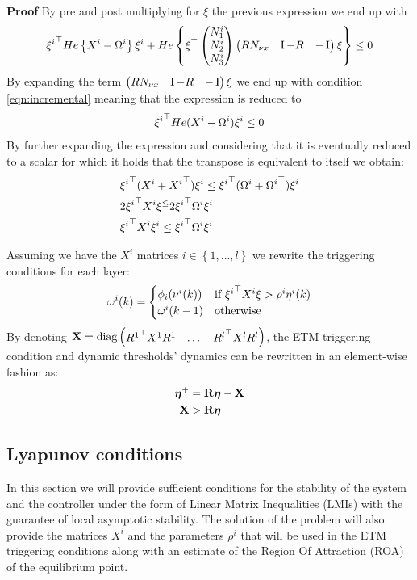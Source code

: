 \documentclass{article}
\begin{document}
\textbf{Proof} By pre and post multiplying for $\xi$ the previous expression we end up with
$$
    {\xi^i}^\top He\left\{X^i - \Omega^i\right\} \xi^i + He\left\{ \xi^\top \left(\begin{matrix}N^i_1\\ N^i_2\\ N^i_3\end{matrix}\right) \left(\begin{matrix}R N_{\nu x} & \operatorname{I} - R & -\operatorname{I}\end{matrix}\right) \xi \right\} \leq 0
$$
By expanding the term $\left(\begin{matrix}R N_{\nu x} & \operatorname{I} - R & -\operatorname{I}\end{matrix}\right) \xi$ we end up with condition \ref{eqn:incremental} meaning that the expression is reduced to
$$
    {\xi^i}^\top He(X^i - \Omega^i) \xi^i \leq 0
$$
By further expanding the expression and considering that it is eventually reduced to a scalar for which it holds that the transpose is equivalent to itself we obtain:  
\begin{equation*}
\begin{aligned}
    &{\xi^i}^\top (X^i + {X^i}^\top) \xi^i \leq {\xi^i}^\top (\Omega^i + {\Omega^i}^\top) \xi^i\\
    &2 {\xi^i}^\top X^i\xi^ \leq 2 {\xi^i}^\top \Omega^i \xi^i\\
    & {\xi^i}^\top X^i \xi^i \leq {\xi^i}^\top \Omega^i \xi^i
\end{aligned}
\end{equation*}

Assuming we have the $X^i$ matrices $i \in \left\{1, \dots, l \right\}$ we rewrite the triggering conditions for each layer:
\begin{equation}
  \omega^{i}(k) = \begin{cases}
    \phi_i(\nu^i(k)) & \text{if } {\xi^i}^\top X^i \xi > \rho^i \eta^i(k)\\
    \omega^{i}(k-1) & \text{otherwise}
  \end{cases}
\end{equation}
By denoting ${\bf{X}} = \text{diag} \left(\begin{matrix}{R^1}^\top X^1 R^1 & \dots & {R^l}^\top X^l R^l\end{matrix}\right)$, the ETM triggering condition and dynamic thresholds' dynamics can be rewritten in an element-wise fashion as:
\begin{equation}
\begin{aligned}
    \boldsymbol{\eta}^+ &= {\bf{R}} \boldsymbol{\eta} - {\bf{X}} \\
    {\bf{X}} &> {\bf{R}} \boldsymbol{\eta}\end{aligned}
\end{equation}

\subsection{Lyapunov conditions}
In this section we will provide sufficient conditions for the stability of the system and the controller under the form of Linear Matrix Inequalities (LMIs) with the guarantee of local asymptotic stability. The solution of the problem will also provide the matrices $X^i$ and the parameters $\rho^i$ that will be used in the ETM triggering conditions along with an estimate of the Region Of Attraction (ROA) of the equilibrium point. 
\end{document}
